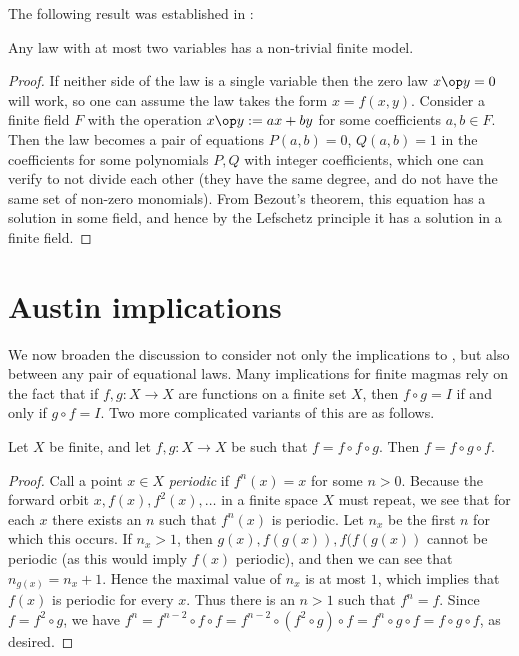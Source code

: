 The following result was established in \cite{austin_finite}:

\begin{theorem}\label{austin-two}\leanok Any law with at most two variables has a non-trivial finite model.
\end{theorem}

\begin{proof} \leanok  If neither side of the law is a single variable then the zero law $x \op y = 0$ will work, so one can assume the law takes the form $x = f(x,y)$.  Consider a finite field $F$ with the operation $x \op y := ax+by$ for some coefficients $a,b \in F$.  Then the law becomes a pair of equations $P(a,b)=0$, $Q(a,b)=1$ in the coefficients for some polynomials $P,Q$ with integer coefficients, which one can verify to not divide each other (they have the same degree, and do not have the same set of non-zero monomials).  From Bezout's theorem, this equation has a solution in some field, and hence by the Lefschetz principle it has a solution in a finite field.
\end{proof}

\section{Austin implications}

We now broaden the discussion to consider not only the implications to , but also between any pair of equational laws.  Many implications for finite magmas rely on the fact that if $f, g:X \to X$ are functions on a finite set $X$, then $f \circ g = I$ if and only if $g \circ f = I$.  Two more complicated variants of this are as follows.

\begin{lemma}\label{ffg}  \leanok Let $X$ be finite, and let $f, g: X \to X$ be such that $f = f \circ f \circ g$.  Then $f = f \circ g \circ f$.
\end{lemma}

\begin{proof} \leanok Call a point $x \in X$ \emph{periodic} if $f^n(x) = x$ for some $n>0$.  Because the forward orbit $x, f(x), f^2(x), \dots$ in a finite space $X$ must repeat, we see that for each $x$ there exists an $n$ such that $f^n(x)$ is periodic.  Let $n_x$ be the first $n$ for which this occurs.  If $n_x > 1$, then $g(x), f(g(x)), f(f(g(x))$ cannot be periodic (as this would imply $f(x)$ periodic), and then we can see that $n_{g(x)} = n_x + 1$.  Hence the maximal value of $n_x$ is at most $1$, which implies that $f(x)$ is periodic for every $x$.  Thus there is an $n > 1$ such that $f^n = f$.  Since $f = f^2 \circ g$, we have $f^n = f^{n-2} \circ f \circ f = f^{n-2} \circ (f^2 \circ g) \circ f = f^n \circ g \circ f = f \circ g \circ f$, as desired.
\end{proof}

